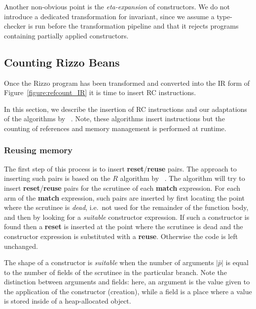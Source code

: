 Another non-obvious point is the \textit{eta-expansion} of constructors.
We do not introduce a dedicated transformation for invariant, since we assume a type-checker is run before the transformation pipeline and that it rejects programs containing partially applied constructors.

\subsection{Counting Rizzo Beans}\label{section:refcount:beans}

Once the Rizzo program has been transformed and converted into the IR form of Figure~\ref{figure:refcount_IR} it is time to insert RC instructions. 

In this section, we describe the insertion of RC instructions and our adaptations of the algorithms by \citeauthor*{ullrich_counting_2021}~\cite{ullrich_counting_2021}. Note, these algorithms insert instructions but the counting of references and memory management is performed at runtime.


\subsubsection{Reusing memory}\label{section:refcount:beans:reuse}

The first step of this process is to insert \textbf{reset}/\textbf{reuse} pairs. The approach to inserting such pairs is based on the $R$ algorithm by \citeauthor*{ullrich_counting_2021}~\cite{ullrich_counting_2021}. 
The algorithm will try to insert \textbf{reset}/\textbf{reuse} pairs for the scrutinee of each \textbf{match} expression.
For each arm of the \textbf{match} expression, such pairs are inserted by first locating the point where the scrutinee is \textit{dead}, i.e.\ not used for the remainder of the function body, and then by looking for a \textit{suitable} constructor expression. If such a constructor is found then a \textbf{reset} is inserted at the point where the scrutinee is dead and the constructor expression is substituted with a \textbf{reuse}. Otherwise the code is left unchanged.

The shape of a constructor is \textit{suitable} when the number of arguments $|\bar p|$ is equal to the number of fields of the scrutinee in the particular branch. Note the distinction between arguments and fields: here, an argument is the value given to the application of the constructor (creation), while a field is a place where a value is stored inside of a heap-allocated object. 

